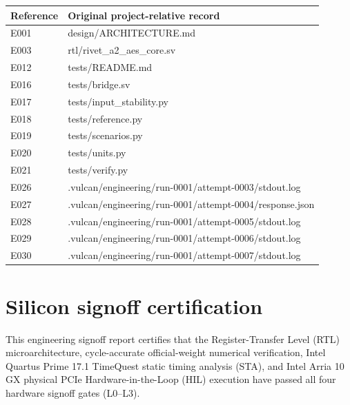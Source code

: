 \documentclass[11pt,a4paper]{article}
\begin{document}
{\small\renewcommand{\arraystretch}{1.18}\begin{longtable}{@{}L{0.12\textwidth}|L{0.82\textwidth}@{}}\toprule

\textbf{Reference} & \textbf{Original project-relative record}\\\midrule\endhead

E001 & design/\allowbreak{}ARCHITECTURE.md\\[2pt]\hline

E003 & rtl/\allowbreak{}rivet\_\allowbreak{}a2\_\allowbreak{}aes\_\allowbreak{}core.sv\\[2pt]\hline

E012 & tests/\allowbreak{}README.md\\[2pt]\hline

E016 & tests/\allowbreak{}bridge.sv\\[2pt]\hline

E017 & tests/\allowbreak{}input\_\allowbreak{}stability.py\\[2pt]\hline

E018 & tests/\allowbreak{}reference.py\\[2pt]\hline

E019 & tests/\allowbreak{}scenarios.py\\[2pt]\hline

E020 & tests/\allowbreak{}units.py\\[2pt]\hline

E021 & tests/\allowbreak{}verify.py\\[2pt]\hline

E026 & .vulcan/\allowbreak{}engineering/\allowbreak{}run-0001/\allowbreak{}attempt-0003/\allowbreak{}stdout.log\\[2pt]\hline

E027 & .vulcan/\allowbreak{}engineering/\allowbreak{}run-0001/\allowbreak{}attempt-0004/\allowbreak{}response.json\\[2pt]\hline

E028 & .vulcan/\allowbreak{}engineering/\allowbreak{}run-0001/\allowbreak{}attempt-0005/\allowbreak{}stdout.log\\[2pt]\hline

E029 & .vulcan/\allowbreak{}engineering/\allowbreak{}run-0001/\allowbreak{}attempt-0006/\allowbreak{}stdout.log\\[2pt]\hline

E030 & .vulcan/\allowbreak{}engineering/\allowbreak{}run-0001/\allowbreak{}attempt-0007/\allowbreak{}stdout.log\\[2pt]\hline

\bottomrule\end{longtable}}

\section{Silicon signoff certification}

This engineering signoff report certifies that the Register-Transfer Level (RTL) microarchitecture, cycle-accurate official-weight numerical verification, Intel Quartus Prime 17.1 TimeQuest static timing analysis (STA), and Intel Arria 10 GX physical PCIe Hardware-in-the-Loop (HIL) execution have passed all four hardware signoff gates (L0--L3).
\end{document}
